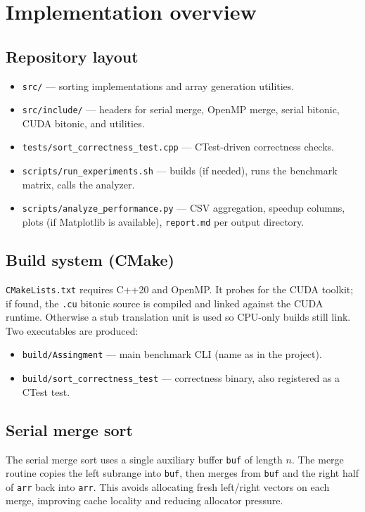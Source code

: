\documentclass[11pt,a4paper]{article}
\begin{document}
\section{Implementation overview}

\subsection{Repository layout}
\begin{itemize}[noitemsep]
  \item \texttt{src/} — sorting implementations and array generation utilities.
  \item \texttt{src/include/} — headers for serial merge, OpenMP merge, serial bitonic, CUDA bitonic, and utilities.
  \item \texttt{tests/sort\_correctness\_test.cpp} — CTest-driven correctness checks.
  \item \texttt{scripts/run\_experiments.sh} — builds (if needed), runs the benchmark matrix, calls the analyzer.
  \item \texttt{scripts/analyze\_performance.py} — CSV aggregation, speedup columns, plots (if Matplotlib is available), \texttt{report.md} per output directory.
\end{itemize}

\subsection{Build system (CMake)}
\texttt{CMakeLists.txt} requires C++20 and OpenMP. It probes for the CUDA toolkit; if found, the \texttt{.cu} bitonic source is compiled and linked against the CUDA runtime. Otherwise a stub translation unit is used so CPU-only builds still link. Two executables are produced:
\begin{itemize}[noitemsep]
  \item \texttt{build/Assingment} — main benchmark CLI (name as in the project).
  \item \texttt{build/sort\_correctness\_test} — correctness binary, also registered as a CTest test.
\end{itemize}

\subsection{Serial merge sort}
The serial merge sort uses a single auxiliary buffer \texttt{buf} of length $n$. The merge routine copies the left subrange into \texttt{buf}, then merges from \texttt{buf} and the right half of \texttt{arr} back into \texttt{arr}. This avoids allocating fresh left/right vectors on each merge, improving cache locality and reducing allocator pressure.
\end{document}
